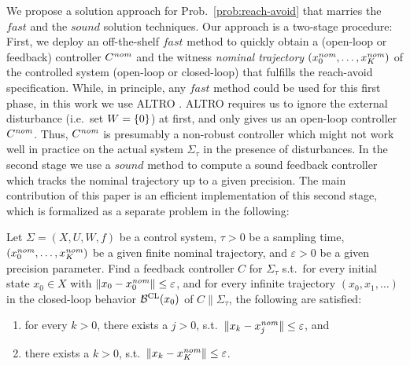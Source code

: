 We propose a solution approach for Prob.~\ref{prob:reach-avoid} that marries the $\mathit{fast}$ and the $\mathit{sound}$ solution techniques.
Our approach is a two-stage procedure: 
First, we deploy an off-the-shelf $\mathit{fast}$ method to quickly obtain a (open-loop or feedback) controller $C^{\mathit{nom}}$ and the witness \emph{nominal trajectory} $(x_0^{\mathit{nom}},\ldots,x_K^{\mathit{nom}})$ of the controlled system (open-loop or closed-loop) that fulfills the reach-avoid specification.
While, in principle, any $\mathit{fast}$ method could be used for this first phase, in this work we use ALTRO \cite{howell2019altro}.
ALTRO requires us to ignore the external disturbance (i.e.\ set $W=\{ 0 \}$) at first, and only gives us an open-loop controller $C^{\mathit{nom}}$.
Thus, $C^{\mathit{nom}}$ is presumably a non-robust controller which might not work well in practice on the actual system $\Sigma_\tau$ in the presence of disturbances.
In the second stage we use a $\mathit{sound}$ method to compute a sound feedback controller which tracks the nominal trajectory up to a given precision.
The main contribution of this paper is an efficient implementation of this second stage, which is formalized as a separate problem in the following:

\begin{problem}\label{prob:tracking}
	Let $\Sigma=(X,U,W,f)$ be a control system, $\tau>0$ be a sampling time, $(x_0^{\mathit{nom}},\ldots,x_K^{\mathit{nom}})$ be a given finite nominal trajectory, and $\varepsilon>0$ be a given precision parameter.
	Find a feedback controller $C$ for $\Sigma_\tau$ s.t.\ for every initial state $x_0\in X$ with $\| x_0-x_0^{\mathit{nom}} \|\leq \varepsilon$, and for every infinite trajectory $(x_0,x_1,\ldots)$ in the closed-loop behavior $\mathcal{B}^{\mathrm{CL}}(x_0)$ of $C \parallel \Sigma_\tau$, the following are satisfied:
	\begin{enumerate}
		\item for every $k > 0$, there exists a $j>0$, s.t.\ $\| x_k-x_j^{\mathit{nom}} \| \leq \varepsilon$, and
		\item there exists a $k>0$, s.t.\ $\| x_k-x_K^{\mathit{nom}} \|\leq \varepsilon$.
	\end{enumerate} 
\end{problem}


